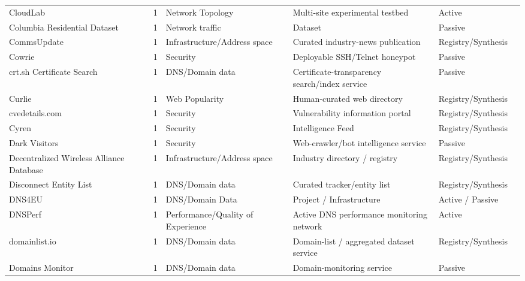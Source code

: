 \documentclass[11pt,a4paper]{article}
\begin{document}
\begin{longtable}{@{}p{}p{}p{}p{}p{}p{}p{}@{}}
CloudLab & \cite{cloudlab} & 1 & Network Topology & Multi-site experimental testbed & Active & \cite{10.1007/978-3-031-85960-1_15} \\
Columbia Residential Dataset & \cite{10.1145/3727133} & 1 & Network traffic & Dataset & Passive & \cite{10.1145/3777912.3839790} \\
CommsUpdate & \cite{commsupdate} & 1 & Infrastructure/Address space & Curated industry-news publication & Registry/Synthesis & \cite{10.1145/3487552.3487822} \\
Cowrie & \cite{cowrie} & 1 & Security & Deployable SSH/Telnet honeypot & Passive & \cite{10.1145/3618257.3624826} \\
crt.sh Certificate Search & \cite{crtsh} & 1 & DNS/Domain data & Certificate-transparency search/index service & Passive & \cite{10.1145/3517745.3561425} \\
Curlie & \cite{curlie} & 1 & Web Popularity & Human-curated web directory & Registry/Synthesis & \cite{10.1145/3618257.3624842} \\
cvedetails.com & \cite{cvedetails} & 1 & Security & Vulnerability information portal & Registry/Synthesis & \cite{10.1145/3618257.3624804} \\
Cyren & \cite{cyren} & 1 & Security & Intelligence Feed & Registry/Synthesis & \cite{10.1145/3777912.3839787} \\
Dark Visitors & \cite{darkvisitors} & 1 & Security & Web-crawler/bot intelligence service & Passive & \cite{10.1145/3730567.3732913} \\
Decentralized Wireless Alliance Database & \cite{dwa} & 1 & Infrastructure/Address space & Industry directory / registry & Registry/Synthesis & \cite{10.1145/3487552.3487846} \\
Disconnect Entity List & \cite{disconnect-entity-list} & 1 & DNS/Domain data & Curated tracker/entity list & Registry/Synthesis & \cite{10.1145/3618257.3624823} \\
DNS4EU & \cite{dns4eu} & 1 & DNS/Domain Data & Project / Infrastructure & Active / Passive & \cite{10.1145/3777912.3839811} \\
DNSPerf & \cite{dns-oarc-dnsperf} & 1 & Performance/Quality of Experience & Active DNS performance monitoring network & Active & \cite{10.1145/3517745.3561445} \\
domainlist.io & \cite{domainlist-io} & 1 & DNS/Domain data & Domain-list / aggregated dataset service & Registry/Synthesis & \cite{10.1007/978-3-030-72582-2_3} \\
Domains Monitor & \cite{domains-monitor} & 1 & DNS/Domain data & Domain-monitoring service & Passive & \cite{10.1007/978-3-031-56252-5_4} \\

\end{longtable}
\end{document}
